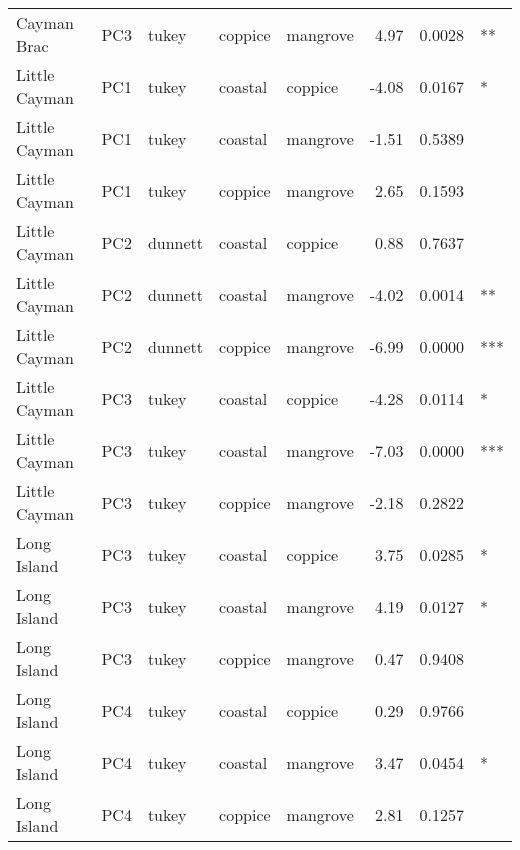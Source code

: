 \begin{tabular}{lllllrrl}
Cayman Brac & PC3 & tukey & coppice & mangrove & 4.97 & 0.0028 & **\\
Little Cayman & PC1 & tukey & coastal & coppice & -4.08 & 0.0167 & *\\
Little Cayman & PC1 & tukey & coastal & mangrove & -1.51 & 0.5389 & \\
Little Cayman & PC1 & tukey & coppice & mangrove & 2.65 & 0.1593 & \\
Little Cayman & PC2 & dunnett & coastal & coppice & 0.88 & 0.7637 & \\
Little Cayman & PC2 & dunnett & coastal & mangrove & -4.02 & 0.0014 & **\\
Little Cayman & PC2 & dunnett & coppice & mangrove & -6.99 & 0.0000 & ***\\
Little Cayman & PC3 & tukey & coastal & coppice & -4.28 & 0.0114 & *\\
Little Cayman & PC3 & tukey & coastal & mangrove & -7.03 & 0.0000 & ***\\
Little Cayman & PC3 & tukey & coppice & mangrove & -2.18 & 0.2822 & \\
Long Island & PC3 & tukey & coastal & coppice & 3.75 & 0.0285 & *\\
Long Island & PC3 & tukey & coastal & mangrove & 4.19 & 0.0127 & *\\
Long Island & PC3 & tukey & coppice & mangrove & 0.47 & 0.9408 & \\
Long Island & PC4 & tukey & coastal & coppice & 0.29 & 0.9766 & \\
Long Island & PC4 & tukey & coastal & mangrove & 3.47 & 0.0454 & *\\
Long Island & PC4 & tukey & coppice & mangrove & 2.81 & 0.1257 & \\
\bottomrule
\end{tabular}
